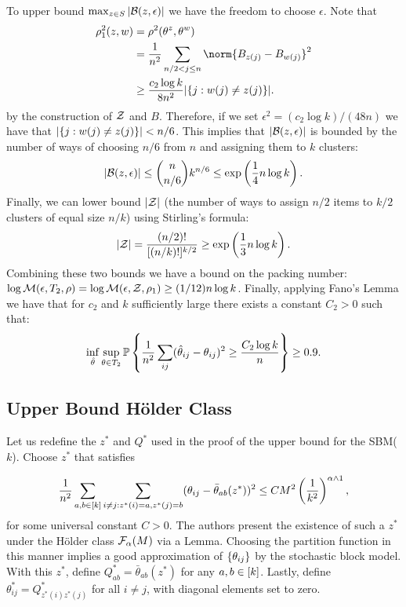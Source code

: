 \documentclass[11pt]{article}
\begin{document}
To upper bound $\max_{z \in S} |\mathcal{B}(z, \epsilon)|$ we have the freedom to choose $\epsilon$. Note that
\begin{equation}
\begin{aligned}
\rho_1^2(z, w) &= \rho^2(\theta^z, \theta^w) \\
               &= \frac{1}{n^2} \sum_{n/2 < j \leq n}\norm{B_{z(j)} - B_{w(j)}}^2 \\
               &\geq \frac{c_2 \log k}{8 n^2} |\set{j : w(j) \neq z(j)}|.
\end{aligned}
\end{equation}
by the construction of $\mathcal{Z}$ and $B$. Therefore, if we set $\epsilon^2 = (c_2 \log k)/(48 n)$ we have that $|\{j : w(j) \neq z(j)\}| < n/6$. This implies that $|\mathcal{B}(z, \epsilon)|$ is bounded by the number of ways of choosing $n/6$ from $n$ and assigning them to $k$ clusters:
\begin{equation}
|\mathcal{B}(z, \epsilon)| \leq {n \choose n/6} k^{n/6} \leq \exp\left(\frac{1}{4} n \log k\right).
\end{equation}
Finally, we can lower bound $|\mathcal{Z}|$ (the number of ways to assign $n/2$ items to $k/2$ clusters of equal size $n/k$) using Stirling's formula:
\begin{equation}
|\mathcal{Z}| = \frac{(n/2)!}{[(n/k)!]^{k/2}} \geq \exp\left(\frac{1}{3} n \log k\right).
\end{equation}
Combining these two bounds we have a bound on the packing number: $\log \mathcal{M}(\epsilon, T_2, \rho) = \log \mathcal{M}(\epsilon, \mathcal{Z}, \rho_1) \geq (1/12) n \log k$. Finally, applying Fano's Lemma we have that for $c_2$ and $k$ sufficiently large there exists a constant $C_2 > 0$ such that:
\begin{equation}\label{eq:sbmclust}
\inf_{\hat{\theta}} \sup_{\theta \in T_2} \mathbb{P} \left\{ \frac{1}{n^2} \sum_{ij} (\hat{\theta}_{ij} - \theta_{ij})^2 \geq \frac{C_2 \log k}{n} \right\} \geq 0.9.
\end{equation}

\subsection{Upper Bound H\"older Class} \label{sec:upper_hold}

Let us redefine the $z^\ast$ and $Q^\ast$ used in the proof of the upper bound for the SBM($k$). Choose $z^\ast$ that satisfies

\[
\frac{1}{n^2} \sum_{a,b\in \lbrack k\rbrack} \sum_{i\neq j: z^\ast(i)=a, z^\ast(j)=b} (\theta_{ij} -\bar{\theta}_{ab}(z^\ast)  )^2 \leq CM^2 \left( \frac{1}{k^2} \right)^{\alpha \wedge 1},
\]
for some universal constant $C >0$. The authors present the existence of such a $z^\ast$ under the H\"older class $\mathcal{F}_{\alpha}(M)$ via a Lemma. Choosing the partition function in this manner implies a good approximation of $\{\theta_{ij}\}$ by the stochastic block model. With this $z^\ast$, define $Q^\ast_{ab} = \bar{\theta}_{ab}(z^\ast)$ for any $a,b \in \lbrack k\rbrack$. Lastly, define $\theta^\ast_{ij} = Q^\ast_{z^\ast(i)z^\ast(j)}$ for all $i \neq j$, with diagonal elements set to zero.
\end{document}
